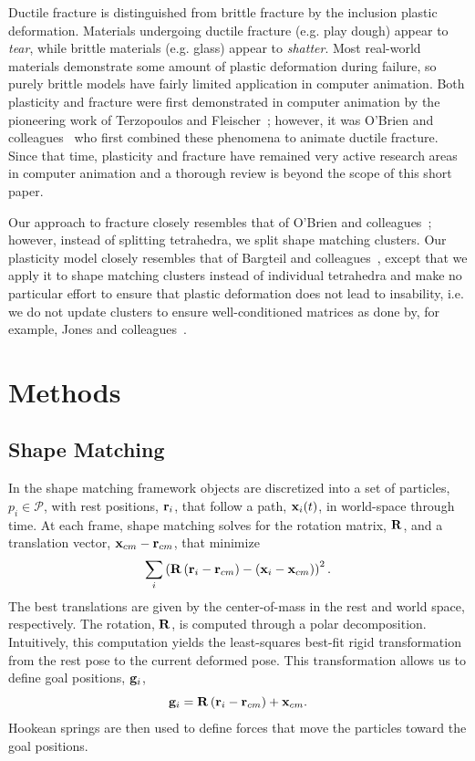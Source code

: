 \documentclass[review]{acmsiggraph}
\begin{document}
Ductile fracture is distinguished from brittle fracture by the inclusion plastic deformation.  Materials undergoing ductile
fracture (e.g. play dough) appear to {\em tear}, while brittle materials (e.g. glass) appear to {\em shatter}.  Most
real-world materials demonstrate some amount of plastic deformation during failure, so purely brittle models have fairly limited
application in computer animation.  
Both plasticity and fracture
were first demonstrated in computer animation by the pioneering work of Terzopoulos and Fleischer~; 
however, it was O'Brien and colleagues~
who first combined these phenomena to animate ductile fracture.  Since that time, plasticity and fracture have
remained very active research areas in computer animation and a thorough review is beyond the scope of this short paper.

Our approach 
to fracture closely resembles that of O'Brien and colleagues~; however, instead of splitting tetrahedra,
we split shape matching clusters.  Our plasticity model closely resembles that of Bargteil and colleagues~, except that
we apply it to shape matching clusters instead of individual tetrahedra and make no particular effort to ensure that plastic deformation does not
lead to insability, i.e. we do not update clusters to ensure well-conditioned matrices as done by, for example, Jones and colleagues~.

\section{Methods}
\subsection{Shape Matching}
In the shape matching framework
objects are discretized into a set of particles, $p_i\in\mathcal{P}$, with rest positions, $\mathit{\mathbf{r}}_i$, 
that follow a path, $\mathit{\mathbf{x}}_i(t)$, in world-space through time.  
At each frame, shape matching solves for the rotation matrix, $\mathit{\mathbf{R}}$, and a translation
vector, $\mathit{\mathbf{x}}_{cm}-\mathit{\mathbf{r}}_{cm}$, that minimize
\begin{equation}
\sum_i \left(\mathit{\mathbf{R}}\left(\mathit{\mathbf{r}}_i - \mathit{\mathbf{r}}_{cm}\right)-\left(\mathit{\mathbf{x}}_i-\mathit{\mathbf{x}}_{cm}\right)\right)^2.
\end{equation}
The best translations are given by the center-of-mass in the rest and world space, respectively.  
The rotation, $\mathit{\mathbf{R}}$, is computed through a polar decomposition.  Intuitively, this computation
yields the least-squares best-fit rigid transformation from the rest pose to the current deformed pose.
This transformation allows us to define goal positions, $\mathit{\mathbf{g}}_i$,
\begin{equation}
\mathit{\mathbf{g}}_i = \mathit{\mathbf{R}}\left(\mathit{\mathbf{r}}_i-\mathit{\mathbf{r}}_{cm}\right)+\mathit{\mathbf{x}}_{cm}.
\end{equation}
Hookean springs are then used to define forces that move the particles toward the goal positions.
\end{document}
